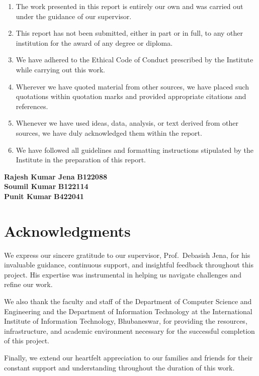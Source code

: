 \documentclass[12pt]{report}
\begin{document}
\begin{enumerate}
    \item The work presented in this report is entirely our own and was carried out under the guidance of our supervisor.
    \item This report has not been submitted, either in part or in full, to any other institution for the award of any degree or diploma.
    \item We have adhered to the Ethical Code of Conduct prescribed by the Institute while carrying out this work.
    \item Wherever we have quoted material from other sources, we have placed such quotations within quotation marks and provided appropriate citations and references.
    \item Whenever we have used ideas, data, analysis, or text derived from other sources, we have duly acknowledged them within the report.
    \item We have followed all guidelines and formatting instructions stipulated by the Institute in the preparation of this report.
\end{enumerate}

\vspace{1cm}

\noindent \textbf{Rajesh Kumar Jena} \hfill \textbf{B122088}\\
\textbf{Soumil Kumar} \hfill \textbf{B122114}\\
\textbf{Punit Kumar} \hfill \textbf{B422041}

\newpage
\chapter*{Acknowledgments}

We express our sincere gratitude to our supervisor, Prof.\ Debasish Jena, for his invaluable
guidance, continuous support, and insightful feedback throughout this project. His expertise
was instrumental in helping us navigate challenges and refine our work.

We also thank the faculty and staff of the Department of Computer Science and Engineering and
the Department of Information Technology at the International Institute of Information
Technology, Bhubaneswar, for providing the resources, infrastructure, and academic environment
necessary for the successful completion of this project.

Finally, we extend our heartfelt appreciation to our families and friends for their constant
support and understanding throughout the duration of this work.
\end{document}

